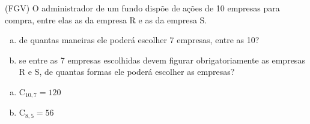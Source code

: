 \begin{ex}
(FGV) O administrador de um fundo dispõe de ações de 10 empresas para compra, entre elas as da empresa R e as da empresa S.
   \begin{enumerate}[(a)]
   \item de quantas maneiras ele poderá escolher 7 empresas, entre as 10?
   \item se entre as 7 empresas escolhidas devem figurar obrigatoriamente as empresas R e S, de quantas formas ele poderá escolher as empresas?
   \end{enumerate}
    \begin{sol}
      \phantom{A}
       \begin{enumerate} [(a)]
           \item $\mathrm{C}_{{10},7}=120$
           \item $\mathrm{C}_{8,5}=56$
       \end{enumerate}
    \end{sol}
\end{ex}